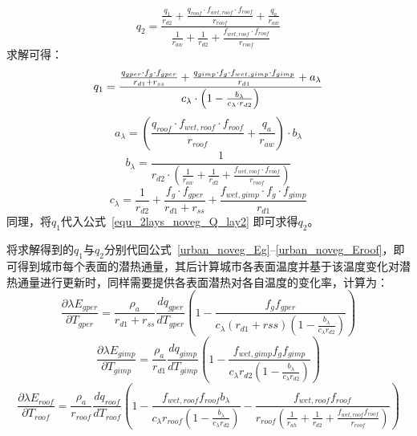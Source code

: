 %
\begin{equation}\label{equ_2lays_noveg_Q_lay2}
    q_{2} = \frac{\frac{q_{1}}{r_{d2}} + \frac{q_{roof} \cdot f_{wet,roof} \cdot f_{roof}}{r_{roof}} + \frac{q_a}{r_{aw}}}{\frac{1}{r_{aw}} + \frac{1}{r_{d2}} + \frac{f_{wet,roof} \cdot f_{roof}}{r_{roof}}}
\end{equation}
求解可得：
\begin{equation}
    q_{1} = \\
    \frac{\frac{q_{gper} \cdot f_{g} \cdot f_{gper}}{r_{d1}+r_{ss}} + \frac{q_{gimp} \cdot f_{g} \cdot f_{wet,gimp} \cdot f_{gimp}}{r_{d1} } + a_{\lambda}}{c_{\lambda} \cdot \left( 1 - \frac{b_{\lambda}}{c_{\lambda} \cdot r_{d2}}\right)}
\end{equation}
%
\begin{equation}
    a_{\lambda}= \left(\frac{q_{roof} \cdot f_{wet,roof} \cdot f_{roof}}{r_{roof}} + \frac{q_a}{r_{aw}}\right) \cdot b_{\lambda}
\end{equation}
%
\begin{equation}
    b_{\lambda} = \frac{1}{r_{d2} \cdot \left( \frac{1}{r_{aw}} + \frac{1}{r_{d2}} + \frac{f_{wet,roof} \cdot f_{roof}}{r_{roof}} \right)}
\end{equation}
%
\begin{equation}
    c_{\lambda} = \frac{1}{r_{d2}}+\frac{f_g \cdot f_{gper}}{r_{d1}+r_{ss}} + \frac{f_{wet,gimp} \cdot f_g \cdot f_{gimp}}{r_{d1}}
\end{equation}
同理，将$q_{1}$代入公式~\eqref{equ_2lays_noveg_Q_lay2} 即可求得$q_{2}$。

将求解得到的$q_{1}$与$q_{2}$分别代回公式~\eqref{urban_noveg_Eg}--\eqref{urban_noveg_Eroof}，即可得到城市每个表面的潜热通量，其后计算城市各表面温度并基于该温度变化对潜热通量进行更新时，同样需要提供各表面潜热对各自温度的变化率，计算为：
\begin{equation}
\frac{\partial \lambda E_{gper}}{\partial T_{gper}} = \frac{\rho _a}{r_{d1}+r_{ss}} \frac{dq_{gper}}{dT_{gper}} \left(1-\frac{f_{g}f_{gper}}{c_{\lambda} \left(r_{d1}+rss\right) \left(1-\frac{b_{\lambda}}{c_{\lambda} r_{d2}}\right)}\right)
\end{equation}
%
\begin{equation}
\frac{\partial \lambda E_{gimp}}{\partial T_{gimp}} = \frac{\rho _a}{r_{d1}} \frac{dq_{gimp}}{dT_{gimp}} \left(1-\frac{f_{wet,gimp} f_{g} f_{gimp}}{c_{\lambda} r_{d2}\left(1-\frac{b_{\lambda}}{c_{\lambda} r_{d2}}\right)}\right)
\end{equation}
%
\begin{equation}
\frac{\partial \lambda E_{roof}}{\partial T_{roof}} = \frac{\rho _a}{r_{roof}} \frac{dq_{roof}}{dT_{roof}} \left(1-\frac{f_{wet,roof}f_{roof} b_{\lambda}}{c_{\lambda} r_{roof} \left(1-\frac{b_{\lambda}}{c_{\lambda} r_{d2}}\right)}-\frac{f_{wet,roof}f_{roof}}{r_{roof}\left(\frac{1}{r_{ah}}+\frac{1}{r_{d2}}+\frac{f_{wet,roof} f_{roof}}{r_{roof}}\right)}\right)
\end{equation}

